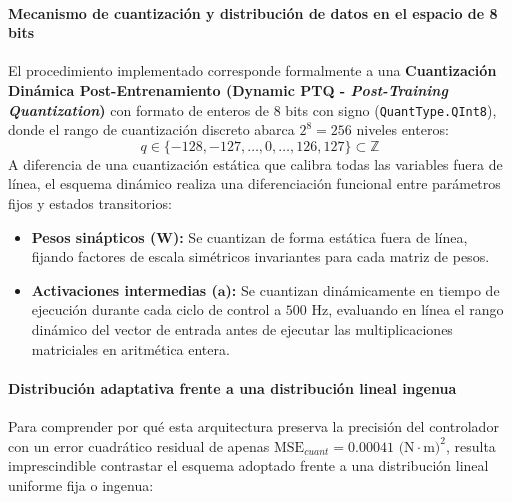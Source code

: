 \documentclass[12pt]{article}
\begin{document}
\paragraph{Mecanismo de cuantización y distribución de datos en el espacio de 8 bits}
El procedimiento implementado corresponde formalmente a una \textbf{Cuantización Dinámica Post-Entrenamiento (Dynamic PTQ - \textit{Post-Training Quantization})} con formato de enteros de 8 bits con signo (\texttt{QuantType.QInt8}), donde el rango de cuantización discreto abarca $2^8 = 256$ niveles enteros:
\begin{equation}
    q \in \{-128, -127, \dots, 0, \dots, 126, 127\} \subset \mathbb{Z}
\end{equation}
A diferencia de una cuantización estática que calibra todas las variables fuera de línea, el esquema dinámico realiza una diferenciación funcional entre parámetros fijos y estados transitorios:
\begin{itemize}
    \item \textbf{Pesos sinápticos ($\bm{W}$):} Se cuantizan de forma estática fuera de línea, fijando factores de escala simétricos invariantes para cada matriz de pesos.
    \item \textbf{Activaciones intermedias ($\bm{a}$):} Se cuantizan dinámicamente en tiempo de ejecución durante cada ciclo de control a $500\text{ Hz}$, evaluando en línea el rango dinámico del vector de entrada antes de ejecutar las multiplicaciones matriciales en aritmética entera.
\end{itemize}

\paragraph{Distribución adaptativa frente a una distribución lineal ingenua}
Para comprender por qué esta arquitectura preserva la precisión del controlador con un error cuadrático residual de apenas $\text{MSE}_{cuant} = 0.00041\text{ (N}\cdot\text{m})^2$, resulta imprescindible contrastar el esquema adoptado frente a una distribución lineal uniforme fija o ingenua:
\end{document}
